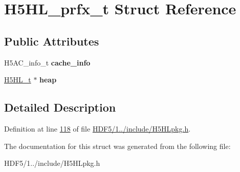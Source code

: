 \hypertarget{struct_h5_h_l__prfx__t}{}\section{H5\+H\+L\+\_\+prfx\+\_\+t Struct Reference}
\label{struct_h5_h_l__prfx__t}
\subsection*{Public Attributes}
\begin{DoxyCompactItemize}
\item 
\mbox{\label{struct_h5_h_l__prfx__t_ac41d6499906c1b48bf5b66caf52a250c}} 
H5\+A\+C\+\_\+info\+\_\+t {\bfseries cache\+\_\+info}
\item 
\mbox{\label{struct_h5_h_l__prfx__t_a9fc497a480ba25369310ab9a8411ee5c}} 
\hyperlink{struct_h5_h_l__t}{H5\+H\+L\+\_\+t} $\ast$ {\bfseries heap}
\end{DoxyCompactItemize}


\subsection{Detailed Description}


Definition at line \hyperlink{_h_d_f5_21_810_81_2include_2_h5_h_lpkg_8h_source_l00118}{118} of file \hyperlink{_h_d_f5_21_810_81_2include_2_h5_h_lpkg_8h_source}{H\+D\+F5/1../include/\+H5\+H\+Lpkg.\+h}.



The documentation for this struct was generated from the following file\+:\begin{DoxyCompactItemize}
\item 
H\+D\+F5/1../include/\+H5\+H\+Lpkg.\+h\end{DoxyCompactItemize}
